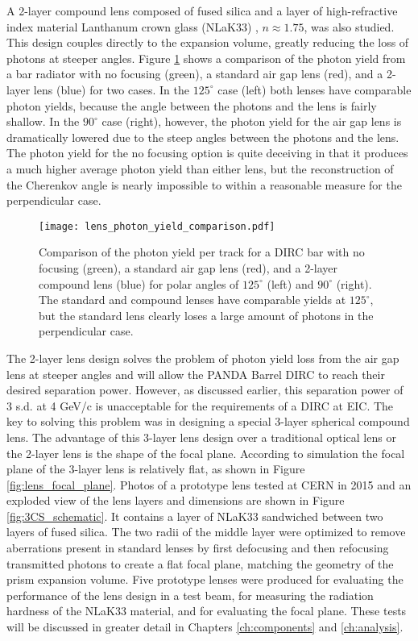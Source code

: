 A 2-layer compound lens composed of fused silica and a layer of high-refractive index material Lanthanum crown glass (NLaK33) \cite{SchottData}, $n \approx 1.75$, was also studied. This design couples directly to the expansion volume, greatly reducing the loss of photons at steeper angles. Figure \ref{fig:lens_photon_yield} shows a comparison of the photon yield from a bar radiator with no focusing (green), a standard air gap lens (red), and a 2-layer lens (blue) for two cases. In the $125^\circ$ case (left) both lenses have comparable photon yields, because the angle between the photons and the lens is fairly shallow. In the $90^\circ$ case (right), however, the photon yield for the air gap lens is dramatically lowered due to the steep angles between the photons and the lens. The photon yield for the no focusing option is quite deceiving in that it produces a much higher average photon yield than either lens, but the reconstruction of the Cherenkov angle is nearly impossible to within a reasonable measure for the perpendicular case.

\begin{figure}[ht]
	\centering
	\texttt{[image: lens\_photon\_yield\_comparison.pdf]}
	\caption{Comparison of the photon yield per track for a DIRC bar with no focusing (green), a standard air gap lens (red), and a 2-layer compound lens (blue) for polar angles of $125^\circ$ (left) and $90^\circ$ (right). The standard and compound lenses have comparable yields at $125^\circ$, but the standard lens clearly loses a large amount of photons in the perpendicular case.}
	\label{fig:lens_photon_yield}
\end{figure}

The 2-layer lens design solves the problem of photon yield loss from the air gap lens at steeper angles and will allow the PANDA Barrel DIRC to reach their desired separation power. However, as discussed earlier, this separation power of 3 s.d. at 4 GeV/c is unacceptable for the requirements of a DIRC at EIC. The key to solving this problem was in designing a special 3-layer spherical compound lens. The advantage of this 3-layer lens design over a traditional optical lens or the 2-layer lens is the shape of the focal plane. According to simulation the focal plane of the 3-layer lens is relatively flat, as shown in Figure \ref{fig:lens_focal_plane}. Photos of a prototype lens tested at CERN in 2015 and an exploded view of the lens layers and dimensions are shown in Figure \ref{fig:3CS_schematic}. It contains a layer of NLaK33 sandwiched between two layers of fused silica. The two radii of the middle layer were optimized to remove aberrations present in standard lenses by first defocusing and then refocusing transmitted photons to create a flat focal plane, matching the geometry of the prism expansion volume. Five prototype lenses were produced for evaluating the performance of the lens design in a test beam, for measuring the radiation hardness of the NLaK33 material, and for evaluating the focal plane. These tests will be discussed in greater detail in Chapters \ref{ch:components} and \ref{ch:analysis}.

